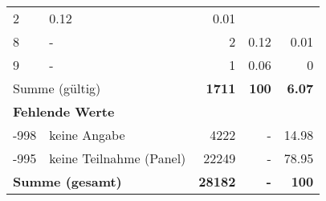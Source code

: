 \begin{longtable}{lXrrr}
       \num{2} &
       \num[round-mode=places,round-precision=2]{0.12} &
         \num[round-mode=places,round-precision=2]{0.01} \\

     8 &
     \multicolumn{1}{X}{ -  } &


       \num{2} &
       \num[round-mode=places,round-precision=2]{0.12} &
         \num[round-mode=places,round-precision=2]{0.01} \\

     9 &
     \multicolumn{1}{X}{ -  } &


       \num{1} &
       \num[round-mode=places,round-precision=2]{0.06} &
         \num[round-mode=places,round-precision=2]{0} \\
     \midrule
     \multicolumn{2}{l}{Summe (gültig)} &
       \textbf{\num{1711}} &
     \textbf{\num{100}} &
       \textbf{\num[round-mode=places,round-precision=2]{6.07}} \\
     \multicolumn{5}{l}{\textbf{Fehlende Werte}}\\
       -998 &
       keine Angabe &
         \num{4222} &
        - &
         \num[round-mode=places,round-precision=2]{14.98} \\
       -995 &
       keine Teilnahme (Panel) &
         \num{22249} &
        - &
         \num[round-mode=places,round-precision=2]{78.95} \\
     \midrule
     \multicolumn{2}{l}{\textbf{Summe (gesamt)}} &
          \textbf{\num{28182}} &
        \textbf{-} &
        \textbf{\num{100}} \\
     \bottomrule
     \end{longtable}
     

